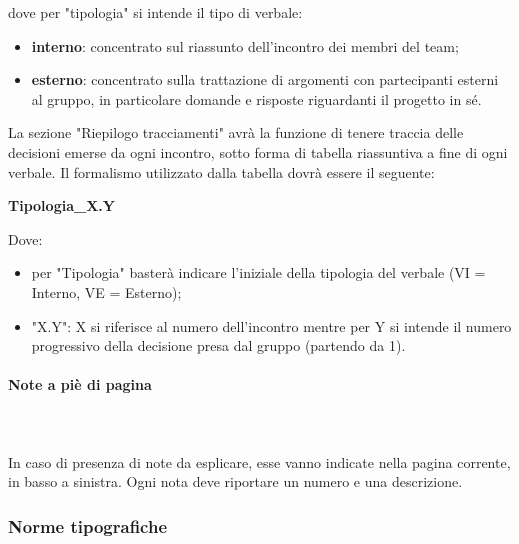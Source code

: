		dove per "tipologia" si intende il tipo di verbale:
		\begin{itemize}
			\item \textbf{interno}: concentrato sul riassunto dell'incontro dei membri del team;
			\item \textbf{esterno}: concentrato sulla trattazione di argomenti con partecipanti esterni al gruppo, in particolare domande e risposte riguardanti il progetto in sé.
		\end{itemize}
		La sezione "Riepilogo tracciamenti" avrà la funzione di tenere traccia delle decisioni emerse da ogni incontro, sotto forma di tabella riassuntiva a fine di ogni verbale. Il formalismo utilizzato dalla tabella dovrà essere il seguente: \newline \newline
		\centerline{\textbf{Tipologia\_X.Y}} \newline \newline
		Dove:
		\begin{itemize}
			\item per "Tipologia" basterà indicare l'iniziale della tipologia del verbale (VI = Interno, VE = Esterno);
			\item "X.Y": X si riferisce al numero dell'incontro mentre per Y si intende il numero progressivo della decisione presa dal gruppo (partendo da 1).
		\end{itemize}	
		\paragraph{Note a piè di pagina} \mbox{}\\ \mbox{}\\
		In caso di presenza di note da esplicare, esse vanno indicate nella pagina corrente, in basso a sinistra. Ogni nota deve riportare un numero e una descrizione.		
	\subsubsection{Norme tipografiche}
